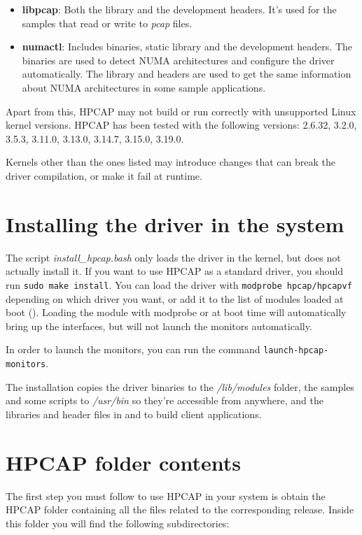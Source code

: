 \documentclass[a4paper,oneside]{hpman}
\newcommand{\supportedkernels}{2.6.32, 3.2.0, 3.5.3, 3.11.0, 3.13.0, 3.14.7, 3.15.0, 3.19.0}
\begin{document}
\begin{itemize}
\item \textbf{libpcap}: Both the library and the development headers. It's used for the samples that read or write to \textit{pcap} files.
\item \textbf{numactl}: Includes binaries, static library and the development headers. The binaries are used to detect NUMA architectures and configure the driver automatically. The library and headers are used to get the same information about NUMA architectures in some sample applications.
\end{itemize}

Apart from this, HPCAP may not build or run correctly with unsupported Linux kernel versions. HPCAP has been tested with the following versions: \supportedkernels.

Kernels other than the ones listed may introduce changes that can break the driver compilation, or make it fail at runtime.

\section{Installing the driver in the system}
\label{sec:SystemInstall}

The script \textit{install\_hpcap.bash} only loads the driver in the kernel, but does not actually install it. If you want to use HPCAP as a standard driver, you should run \texttt{sudo make install}. You can load the driver with \texttt{modprobe hpcap/hpcapvf} depending on which driver you want, or add it to the list of modules loaded at boot (). Loading the module with modprobe or at boot time will automatically bring up the interfaces, but will not launch the monitors automatically.

In order to launch the monitors, you can run the command \texttt{launch-hpcap-monitors}.

The installation copies the driver binaries to the \textit{/lib/modules} folder, the samples and some scripts to \textit{/usr/bin} so they're accessible from anywhere, and the libraries and header files in  and  to build client applications.

\section{HPCAP folder contents}

The first step you must follow to use HPCAP in your system is obtain the HPCAP folder containing all the files related to the corresponding release. Inside this folder you will find the following subdirectories:
\end{document}

